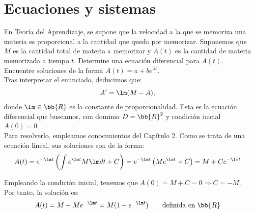 \section{Ecuaciones y sistemas}

\begin{ejercicio}
    En Teoría del Aprendizaje, se supone que la velocidad a la que se memoriza una materia es proporcional a la
    cantidad que queda por memorizar. Suponemos que \(M\) es la cantidad total de materia a memorizar y \(A(t)\) es la
    cantidad de materia memorizada a tiempo \(t\). Determine una ecuación diferencial para \(A(t)\). Encuentre soluciones
    de la forma \(A(t) = a + be^{\lambda t}\).\\

    Tras interpretar el enunciado, deducimos que:
    \begin{equation*}
        A' = \lm(M - A),
    \end{equation*}
    donde $\lm\in \bb{R}$ es la constante de proporcionalidad.    
    Esta es la ecuación diferencial que buscamos, con dominio $D=\bb{R}^2$ y condición inicial $A(0)=0$.\\

    Para resolverlo, empleamos conocimientos del Capítulo 2. Como se trata de una ecuación lineal, sus soluciones son de la forma:
    \begin{equation*}
        A(t) = e^{-\lm t}\left(\int e^{\lm t}M\lm dt + C\right) = e^{-\lm t}\left(Me^{\lm t} + C\right) = M + Ce^{-\lm t}
    \end{equation*}

    Empleando la condición inicial, tenemos que $A(0)=M+C=0\Longrightarrow C=-M$. Por tanto, la solución es:
    \begin{equation*}
        A(t) = M - Me^{-\lm t} = M(1-e^{-\lm t}) \qquad \text{definida en } \bb{R}
    \end{equation*}
\end{ejercicio}


